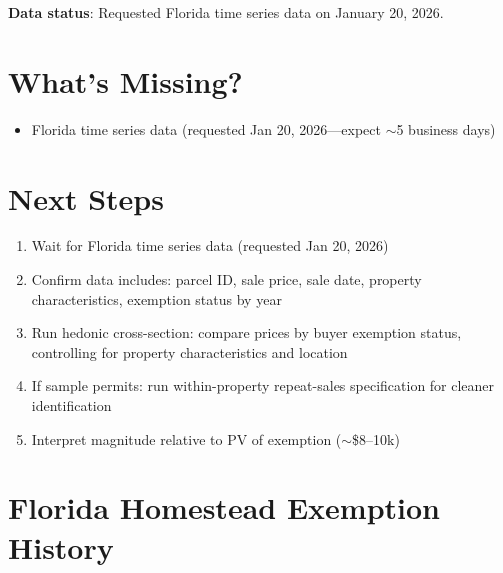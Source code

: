 \documentclass[11pt]{article}
\begin{document}
\textbf{Data status}: Requested Florida time series data on January 20, 2026.

\section{What's Missing?}

\begin{itemize}
    \item Florida time series data (requested Jan 20, 2026---expect $\sim$5 business days)
\end{itemize}

\section{Next Steps}

\begin{enumerate}
    \item Wait for Florida time series data (requested Jan 20, 2026)
    \item Confirm data includes: parcel ID, sale price, sale date, property characteristics, exemption status by year
    \item Run hedonic cross-section: compare prices by buyer exemption status, controlling for property characteristics and location
    \item If sample permits: run within-property repeat-sales specification for cleaner identification
    \item Interpret magnitude relative to PV of exemption ($\sim$\$8--10k)
\end{enumerate}

\appendix
\section{Florida Homestead Exemption History}
\end{document}
